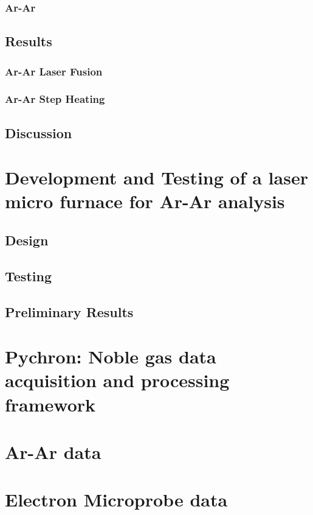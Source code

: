 \documentclass[12pt]{report}
\begin{document}
\subsection{Ar-Ar}
\section{Results}
\subsection{Ar-Ar Laser Fusion}
\subsection{Ar-Ar Step Heating}
\section{Discussion}
\chapter{Development and Testing of a laser micro furnace for Ar-Ar analysis}
\section{Design}
\section{Testing}
\section{Preliminary Results}
\chapter{Pychron: Noble gas data acquisition and processing framework}

\appendix
\chapter{Ar-Ar data}
\chapter{Electron Microprobe data}



\nocite{*} %

% 
%
%
%
\begin{References}[99]
%
%


\end{References}
\copyrightpage
\end{document}
